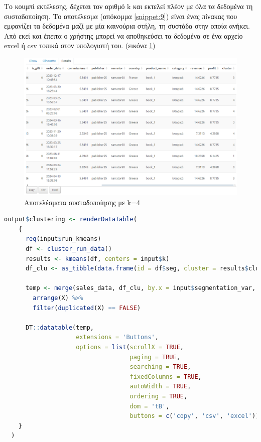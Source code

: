 \documentclass{article}
\begin{document}
Το κουμπί εκτέλεσης, δέχεται τον αριθμό k και εκτελεί πλέον με όλα τα δεδομένα τη συσταδοποίηση. Το αποτέλεσμα (απόκομμα \ref{snippet:9}) είναι ένας πίνακας που εμφανίζει τα δεδομένα μαζί με μία καινούρια στήλη, τη συστάδα στην οποία ανήκει. Από εκεί και έπειτα ο χρήστης μπορεί να αποθηκεύσει τα δεδομένα σε ένα αρχείο excel ή csv τοπικά στον υπολογιστή του. (εικόνα \ref{fig:17})

\begin{figure}[h]
    \centering
    \includegraphics[width=\textwidth]{pictures/17_clustering_results.png}
    \caption{Αποτελέσματα συσταδοποίησης με k=4}
    \label{fig:17}
\end{figure}

\newpage

\begin{lstlisting}[language=R, caption=Κώδικας της συσταδοποίησης, label={snippet:9}]
output$clustering <- renderDataTable(
    {
      req(input$run_kmeans)
      df <- cluster_run_data()
      results <- kmeans(df, centers = input$k)
      df_clu <- as_tibble(data.frame(id = df$seg, cluster = results$cluster))

      temp <- merge(sales_data, df_clu, by.x = input$segmentation_var, by.y = 'id', all.x=T) %>%
        arrange(X) %>%
        filter(duplicated(X) == FALSE)

      DT::datatable(temp,
                    extensions = 'Buttons',
                    options = list(scrollX = TRUE,
                                   paging = TRUE,
                                   searching = TRUE,
                                   fixedColumns = TRUE,
                                   autoWidth = TRUE,
                                   ordering = TRUE,
                                   dom = 'tB',
                                   buttons = c('copy', 'csv', 'excel')))
    }
  )
\end{lstlisting}
\end{document}

